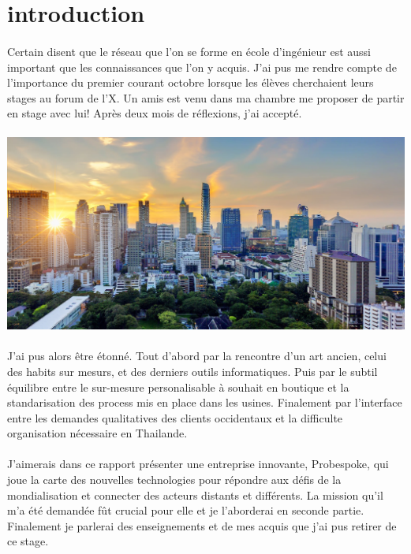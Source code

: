 \section*{introduction}
\paragraph{}
Certain disent que le réseau que l'on se forme en école d'ingénieur est aussi important que les connaissances que l'on y acquis. J'ai pus me rendre compte de l'importance du premier courant octobre lorsque les élèves cherchaient leurs stages au forum de l'X. Un amis est venu dans ma chambre me proposer de partir en stage avec lui! Après deux mois de réflexions, j'ai accepté.
\paragraph{}
\includegraphics[width=16cm]{image/business.jpg}
\paragraph{}
J'ai pus alors être étonné. Tout d'abord par la rencontre d'un art ancien, celui des habits sur mesurs, et des derniers outils informatiques. Puis par le subtil équilibre entre le sur-mesure personalisable à souhait en boutique et la standarisation des process mis en place dans les usines. Finalement par l'interface entre les demandes qualitatives des clients occidentaux et la difficulte organisation nécessaire en Thailande.
\paragraph{}
J'aimerais dans ce rapport présenter une entreprise innovante, Probespoke, qui joue la carte des nouvelles technologies pour répondre aux défis de la mondialisation et connecter des acteurs distants et différents. La mission qu'il m'a été demandée fût crucial pour elle et je l'aborderai en seconde partie. Finalement je parlerai des enseignements et de mes acquis que j'ai pus retirer de ce stage.
